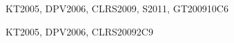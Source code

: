 \begin{syllabus}
\begin{unit}{\ALFundamentalDataStructuresandAlgorithms}{}{KT2005, DPV2006, CLRS2009, S2011, GT2009}{10}{C6}
\begin{learningoutcomes}
    \item \ALFundamentalDataStructuresandAlgorithmsLODiscussFactors [\Familiarity] %
    \item \ALFundamentalDataStructuresandAlgorithmsLOSolveProblems [\Assessment] %
    \item \ALFundamentalDataStructuresandAlgorithmsLODemonstrate [\Assessment] %
    \item \ALFundamentalDataStructuresandAlgorithmsLODescribeTheAnd [\Assessment] %
    \item \ALFundamentalDataStructuresandAlgorithmsLOSolveProblemsAlgorithms [\Assessment] %
\end{learningoutcomes}
\end{unit}

\begin{unit}{\ALBasicAutomataComputabilityandComplexity}{}{KT2005, DPV2006, CLRS2009}{2}{C9}
\begin{topics}%
    \item \ALBasicAutomataComputabilityandComplexityTopicIntroduction %
    \item \ALBasicAutomataComputabilityandComplexityTopicIntroductionTo %
\end{topics}
\begin{learningoutcomes}
    \item \ALBasicAutomataComputabilityandComplexityLODefine [\Familiarity] %
    \item \ALBasicAutomataComputabilityandComplexityLOExplainTheNp [\Familiarity] %
\end{learningoutcomes}
\end{unit}


\end{syllabus}

